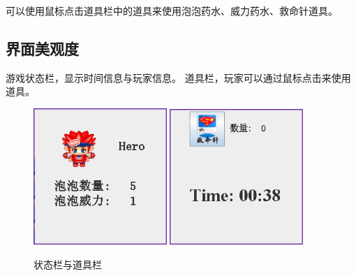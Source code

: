 \documentclass[UTF8, a4paper]{ctexart}
\begin{document}
可以使用鼠标点击道具栏中的道具来使用泡泡药水、威力药水、救命针道具。

\subsection{界面美观度}
游戏状态栏，显示时间信息与玩家信息。
道具栏，玩家可以通过鼠标点击来使用道具。
  \begin{figure}[h]
    \centering
        {\includegraphics[width=0.45\textwidth]{playerinfo.png}}
    \hspace{0.05\textwidth}
        {\includegraphics[width=0.45\textwidth]{time.png}}
    \caption{状态栏与道具栏}
    \label{fig:gameSetup}
  \end{figure}
\end{document}

